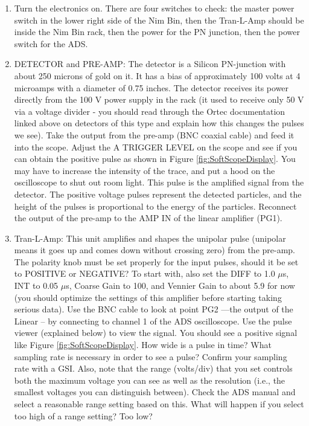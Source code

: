 \documentclass{../lab}
\begin{document}
\begin{enumerate}
    \item Turn the electronics on. There are four switches to check: the master power switch in the lower right side of the Nim Bin, then the Tran-L-Amp should be inside the Nim Bin rack, then the power for the PN junction, then the power switch for the ADS.

    \item DETECTOR and PRE-AMP: The detector is a Silicon PN-junction with about 250 microns of gold on it. It has a bias of approximately 100 volts at 4 microamps with a diameter of 0.75 inches. The detector receives its power directly from the 100 V power supply in the rack (it used to receive only 50 V via a voltage divider - you should read through the Ortec documentation linked above on detectors of this type and explain how this changes the pulses we see).%
    Take the output from the pre-amp (BNC coaxial cable) and feed it into the scope. Adjust the A TRIGGER LEVEL on the scope and see if you can obtain the positive pulse as shown in Figure \ref{fig:SoftScopeDisplay}. You may have to increase the intensity of the trace, and put a hood on the oscilloscope to shut out room light. This pulse is the amplified signal from the detector. The positive voltage pulses represent the detected \textalpha{} particles, and the height of the pulses is proportional to the energy of the particles. Reconnect the output of the pre-amp to the AMP IN of the linear amplifier (PG1).

    \item Tran-L-Amp: This unit amplifies and shapes the unipolar pulse (unipolar means it goes up and comes down without crossing zero) from the pre-amp. The polarity knob must be set properly for the input pulses, should it be set to POSITIVE or NEGATIVE? To start with, also set the DIFF to 1.0 $\mu$s, INT to 0.05 $\mu$s, Coarse Gain to 100, and Vennier Gain to about 5.9 for now (you should optimize the settings of this amplifier before starting taking serious data). Use the BNC cable to look at point PG2 ---the output of the Linear -- by connecting to channel 1 of the ADS oscilloscope. Use the pulse viewer (explained below) to view the signal. You should see a positive signal like Figure \ref{fig:SoftScopeDisplay}. %
    How wide is a pulse in time? What sampling rate is necessary in order to see a pulse? Confirm your sampling rate with a GSI. %
    Also, note that the range (volts/div) that you set controls both the maximum voltage you can see as well as the resolution (i.e., the smallest voltages you can distinguish between). Check the ADS manual and select a reasonable range setting based on this. What will happen if you select too high of a range setting? Too low?

\end{enumerate}
\end{document}
